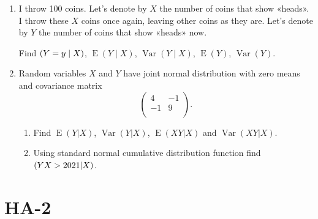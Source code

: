 \documentclass[12pt]{article}
\DeclareMathOperator{\Var}{Var}
\DeclareMathOperator{\E}{E}
\let\P\relax
\DeclareMathOperator{\P}{\mathbb{P}}
\begin{document}
\begin{enumerate}
\item I throw 100 coins. Let's denote by $X$ the number of coins that show «heads».
I throw these $X$ coins once again, leaving other coins as they are. 
Let's denote by $Y$ the number of coins that show «heads» now.

Find $\P(Y=y \mid X)$, $\E(Y \mid X)$, $\Var(Y \mid X)$, $\E(Y)$, $\Var(Y)$.




\item Random variables $X$ and $Y$ have joint normal distribution with zero means and covariance matrix
\[
\begin{pmatrix}
4 & -1 \\
-1 & 9 \\
\end{pmatrix}.
\]

\begin{enumerate}
  \item Find $\E(Y|X)$, $\Var(Y|X)$, $\E(XY|X)$ and $\Var(XY|X)$.
  \item Using standard normal cumulative distribution function find $\P(YX > 2021 | X)$.
\end{enumerate}



\end{enumerate}

\newpage
\section{HA-2}
\end{document}
